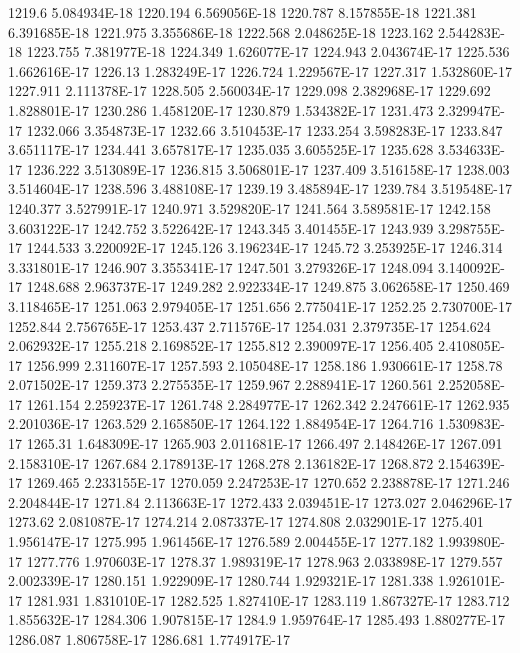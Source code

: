 1219.6  5.084934E-18
1220.194  6.569056E-18
1220.787  8.157855E-18
1221.381  6.391685E-18
1221.975  3.355686E-18
1222.568  2.048625E-18
1223.162  2.544283E-18
1223.755  7.381977E-18
1224.349  1.626077E-17
1224.943  2.043674E-17
1225.536  1.662616E-17
1226.13  1.283249E-17
1226.724  1.229567E-17
1227.317  1.532860E-17
1227.911  2.111378E-17
1228.505  2.560034E-17
1229.098  2.382968E-17
1229.692  1.828801E-17
1230.286  1.458120E-17
1230.879  1.534382E-17
1231.473  2.329947E-17
1232.066  3.354873E-17
1232.66  3.510453E-17
1233.254  3.598283E-17
1233.847  3.651117E-17
1234.441  3.657817E-17
1235.035  3.605525E-17
1235.628  3.534633E-17
1236.222  3.513089E-17
1236.815  3.506801E-17
1237.409  3.516158E-17
1238.003  3.514604E-17
1238.596  3.488108E-17
1239.19  3.485894E-17
1239.784  3.519548E-17
1240.377  3.527991E-17
1240.971  3.529820E-17
1241.564  3.589581E-17
1242.158  3.603122E-17
1242.752  3.522642E-17
1243.345  3.401455E-17
1243.939  3.298755E-17
1244.533  3.220092E-17
1245.126  3.196234E-17
1245.72  3.253925E-17
1246.314  3.331801E-17
1246.907  3.355341E-17
1247.501  3.279326E-17
1248.094  3.140092E-17
1248.688  2.963737E-17
1249.282  2.922334E-17
1249.875  3.062658E-17
1250.469  3.118465E-17
1251.063  2.979405E-17
1251.656  2.775041E-17
1252.25  2.730700E-17
1252.844  2.756765E-17
1253.437  2.711576E-17
1254.031  2.379735E-17
1254.624  2.062932E-17
1255.218  2.169852E-17
1255.812  2.390097E-17
1256.405  2.410805E-17
1256.999  2.311607E-17
1257.593  2.105048E-17
1258.186  1.930661E-17
1258.78  2.071502E-17
1259.373  2.275535E-17
1259.967  2.288941E-17
1260.561  2.252058E-17
1261.154  2.259237E-17
1261.748  2.284977E-17
1262.342  2.247661E-17
1262.935  2.201036E-17
1263.529  2.165850E-17
1264.122  1.884954E-17
1264.716  1.530983E-17
1265.31  1.648309E-17
1265.903  2.011681E-17
1266.497  2.148426E-17
1267.091  2.158310E-17
1267.684  2.178913E-17
1268.278  2.136182E-17
1268.872  2.154639E-17
1269.465  2.233155E-17
1270.059  2.247253E-17
1270.652  2.238878E-17
1271.246  2.204844E-17
1271.84  2.113663E-17
1272.433  2.039451E-17
1273.027  2.046296E-17
1273.62  2.081087E-17
1274.214  2.087337E-17
1274.808  2.032901E-17
1275.401  1.956147E-17
1275.995  1.961456E-17
1276.589  2.004455E-17
1277.182  1.993980E-17
1277.776  1.970603E-17
1278.37  1.989319E-17
1278.963  2.033898E-17
1279.557  2.002339E-17
1280.151  1.922909E-17
1280.744  1.929321E-17
1281.338  1.926101E-17
1281.931  1.831010E-17
1282.525  1.827410E-17
1283.119  1.867327E-17
1283.712  1.855632E-17
1284.306  1.907815E-17
1284.9  1.959764E-17
1285.493  1.880277E-17
1286.087  1.806758E-17
1286.681  1.774917E-17
